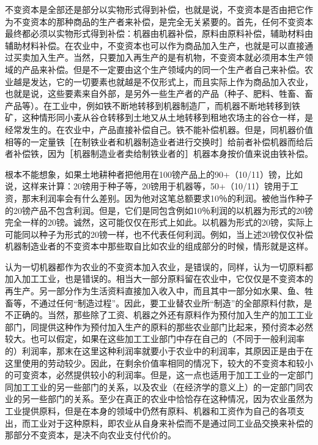 不变资本是全部还是部分以实物形式得到补偿，也就是说，不变资本是否由把它作为不变资本的那种商品的生产者来补偿，是完全无关紧要的。首先，任何不变资本最终都必须以实物形式得到补偿：机器由机器补偿，原料由原料补偿，辅助材料由辅助材料补偿。在农业中，不变资本也可以作为商品加入生产，也就是可以直接通过买卖加入生产。当然，只要加入再生产的是有机物，不变资本就必须用本生产领域的产品来补偿。但是不一定要由这个生产领域内的同一个生产者自己来补偿。农业越是发达，它的一切要素也就越是不仅形式上，而且实际上作为商品加入农业，也就是说，这些要素来自外部，是另外一些生产者的产品（种子、肥料、牲畜、畜产品等）。在工业中，例如铁不断地转移到机器制造厂，而机器不断地转移到铁矿，这种情形同小麦从谷仓转移到土地又从土地转移到租地农场主的谷仓一样，是经常发生的。在农业中，产品直接补偿自己。铁不能补偿机器。但是，同机器价值相等的一定量铁［在制铁业者和机器制造业者进行交换时］给前者补偿机器而给后者补偿铁，因为［机器制造业者卖给制铁业者的］机器本身按价值来说由铁补偿。

根本不能想象，如果土地耕种者把他用在100镑产品上的90+（10/11）镑，比如说，这样来计算：20镑用于种子等，20镑用于机器等，50+（10/11）镑用于工资，那末利润率会有什么差别。因为他对这笔总额要求10％的利润。被他当作种子的20镑产品不包含利润。但是，它们是同包含例如10％利润的以机器为形式的20镑完全一样的20镑。诚然，这可能仅仅在形式上如此。以机器为形式的20镑，实际上可能同以种子为形式的20镑一样，也不代表任何利润。例如，当上述20镑仅仅补偿机器制造业者的不变资本中那些取自比如农业的组成部分的时候，情形就是这样。

认为一切机器都作为农业的不变资本加入农业，是错误的，同样，认为一切原料都加入加工工业，也是错误的。相当大一部分原料留在农业中，它仅仅是不变资本的再生产。另一部分作为生活资料直接加入收入中，而且其中一部分如水果、鱼、牲畜等，不通过任何“制造过程”。因此，要工业替农业所“制造”的全部原料付款，是不正确的。当然，那些除了工资、机器之外还有原料作为预付加入生产的加工工业部门，同提供这种作为预付加入生产的原料的那些农业部门比起来，预付资本必然较大。也可以假定，如果在这些加工工业部门中存在自己的（不同于一般利润率的）利润率，那末在这里这种利润率就要小于农业中的利润率，其原因正是由于在这里使用的劳动较少。因此，在剩余价值率相同的情况下，较大的不变资本和较小的可变资本，必然提供较小的利润率。但是，这一点也适用于加工工业的一定部门同加工工业的另一些部门的关系，以及农业（在经济学的意义上）的一定部门同农业的另一些部门的关系。至少在真正的农业中恰恰存在这种情况，因为农业虽然为工业提供原料，但是在本身的领域中仍然有原料、机器和工资作为自己的各项支出，而工业对于这种原料，即农业从自身来补偿而不是通过同工业品交换来补偿的那部分不变资本，是决不向农业支付代价的。

